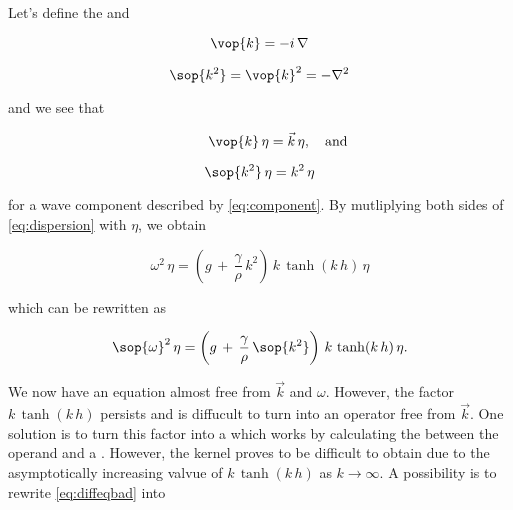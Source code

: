 Let's define the  and 

\begin{samepage}
\begin{equation} \label{eq:opkvec}
\vop{k} = -i\,\nabla
\end{equation}

\begin{equation} \label{eq:opk2}
\sop{k^2} = \vop{k}^2 = -\nabla^2
\end{equation}
\end{samepage}

and we see that 

\begin{samepage}
\begin{equation} \label{eq:opkvec1action}
\phantom{and}\quad\vop{k}\,\eta = \vec{k}\,\eta,\quad\text{and}
\end{equation}

\begin{equation} \label{eq:opk2action}
\sop{k^2}\,\eta = k^2\,\eta
\end{equation}
\end{samepage}

for a wave component described by \eqref{eq:component}. By mutliplying both sides of \eqref{eq:dispersion} with $\eta$, we obtain

\begin{equation}
\omega^2\,\eta = \left(g\,+\,\frac{\gamma}{\rho}\,k^2\right)\,k\,\tanh(k\,h)\,\eta
\end{equation}

which can be rewritten as

\begin{equation} \label{eq:diffeqbad}
\sop{\omega}^2\,\eta = \left(g\,+\,\frac{\gamma}{\rho}\,\sop{k^2}\right)\,k\,\tanh(k\,h)\,\eta.
\end{equation}

We now have an equation almost free from $\vec{k}$ and $\omega$. However, the factor $k\,\tanh(k\,h)$ persists and is diffucult to turn into an operator free from $\vec{k}$. One solution is to turn this factor into a  which works by calculating the  between the operand and a . However, the kernel proves to be difficult to obtain due to the asymptotically increasing valvue of $k\,\tanh(k\,h)$ as $k\rightarrow\infty$. A possibility is to rewrite \eqref{eq:diffeqbad} into

